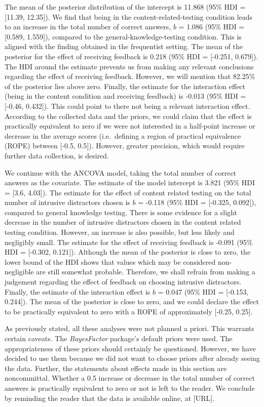 \documentclass[../main.tex]{subfiles}
\begin{document}
The mean of the posterior distribution of the intercept is 11.868 (95\%
HDI = {[}11.39, 12.35{]}). We find that being in the
content-related-testing condition leads to an increase in the total
number of correct answers, \(b\) = 1.086 (95\% HDI = {[}0.589,
1.559{]}), compared to the general-knowledge-testing condition. This is
aligned with the finding obtained in the frequentist setting. The mean
of the posterior for the effect of receiving feedback is 0.218 (95\% HDI
= {[}-0.251, 0.679{]}). The HDI around the estimate prevents us from
making any relevant conclusions regarding the effect of receiving
feedback. However, we will mention that 82.25\% of the posterior lies
above zero. Finally, the estimate for the interaction effect (being in
the content condition and receiving feedback) is -0.013 (95\% HDI =
{[}-0.46, 0.432{]}). This could point to there not being a relevant
interaction effect. According to the collected data and the priors, we
could claim that the effect is practically equivalent to zero if we were
not interested in a half-point increase or decrease in the average
scores (i.e.~defining a region of practical equivalence (ROPE) between
{[}-0.5, 0.5{]}). However, greater precision, which would require
further data collection, is desired.

We continue with the ANCOVA model, taking the total number of correct
answers as the covariate. The estimate of the model intercept is 3.821
(95\% HDI = {[}3.6, 4.03{]}). The estimate for the effect of content
related testing on the total number of intrusive distractors chosen is
\(b\) = -0.118 (95\% HDI = {[}-0.325, 0.092{]}), compared to general
knowledge testing. There is some evidence for a slight decrease in the
number of intrusive distractors chosen in the content related testing
condition. However, an increase is also possible, but less likely and
negligibly small. The estimate for the effect of receiving feedback is
-0.091 (95\% HDI = {[}-0.302, 0.121{]}). Although the mean of the
posterior is close to zero, the lower bound of the HDI shows that values
which may be considered non-negligible are still somewhat probable.
Therefore, we shall refrain from making a judgement regarding the effect
of feedback on choosing intrusive distractors. Finally, the estimate of
the interaction effect is \(b\) = 0.047 (95\% HDI = {[}-0.153,
0.244{]}). The mean of the posterior is close to zero, and we could
declare the effect to be practically equivalent to zero with a ROPE of
approximately {[}-0.25, 0.25{]}.

As previously stated, all these analyses were not planned a priori. This
warrants certain caveats. The \textit{BayesFactor} package's default
priors were used. The appropriateness of these priors should certainly
be questioned. However, we have decided to use them because we did not
want to choose priors after already seeing the data. Further, the
statements about effects made in this section are noncommittal. Whether
a 0.5 increase or decrease in the total number of correct answers is
practically equivalent to zero or not is left to the reader. We conclude
by reminding the reader that the data is available online, at {[}URL{]}.
\end{document}
